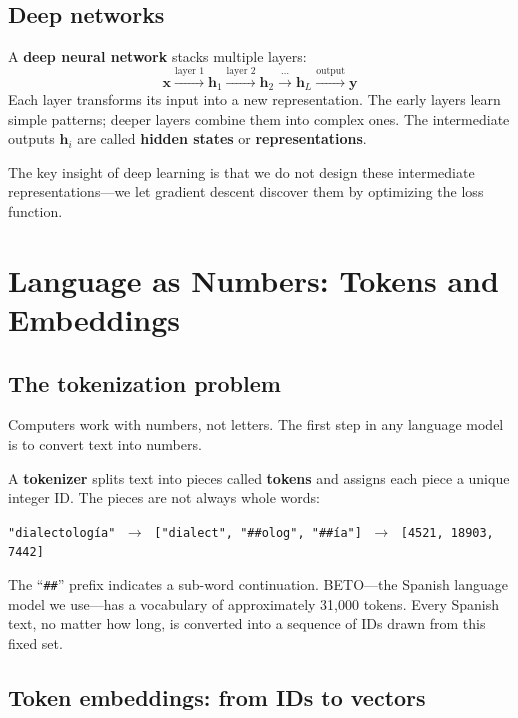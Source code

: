 \documentclass[11pt,a4paper]{article}
\theoremstyle{definition}
\begin{document}
\subsection{Deep networks}

A \textbf{deep neural network} stacks multiple layers:
\[
\mathbf{x}
\xrightarrow{\text{layer 1}} \mathbf{h}_1
\xrightarrow{\text{layer 2}} \mathbf{h}_2
\xrightarrow{\;\cdots\;} \mathbf{h}_L
\xrightarrow{\text{output}} \mathbf{y}
\]
Each layer transforms its input into a new representation. The early
layers learn simple patterns; deeper layers combine them into complex
ones. The intermediate outputs $\mathbf{h}_i$ are called
\textbf{hidden states} or \textbf{representations}.

The key insight of deep learning is that we do not design these
intermediate representations---we let gradient descent discover them
by optimizing the loss function.

\section{Language as Numbers: Tokens and Embeddings}
\label{sec:tokens}

\subsection{The tokenization problem}

Computers work with numbers, not letters. The first step in any
language model is to convert text into numbers.

A \textbf{tokenizer} splits text into pieces called \textbf{tokens}
and assigns each piece a unique integer ID. The pieces are not always
whole words:

\begin{center}
\texttt{"dialectolog\'{i}a"} $\;\to\;$
\texttt{["dialect", "\#\#olog", "\#\#\'{i}a"]} $\;\to\;$
\texttt{[4521, 18903, 7442]}
\end{center}

The ``\texttt{\#\#}'' prefix indicates a sub-word continuation.
BETO---the Spanish language model we use---has a vocabulary of
approximately 31,000 tokens. Every Spanish text, no matter how long,
is converted into a sequence of IDs drawn from this fixed set.

\subsection{Token embeddings: from IDs to vectors}
\end{document}
